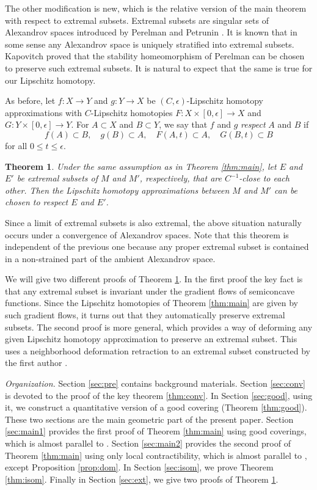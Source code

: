 \documentclass[a4paper,12pt]{amsart}
\theoremstyle{plain}
\newtheorem{thm}{Theorem}
\theoremstyle{definition}
\numberwithin{thm}{section}
\numberwithin{equation}{section}
\newcommand{\step}[1]{\medskip\noindent\textit{#1.}}
\begin{document}
The other modification is new, which is the relative version of the main theorem with respect to extremal subsets.
Extremal subsets are singular sets of Alexandrov spaces introduced by Perelman and Petrunin \cite{PP:ext}.
It is known that in some sense any Alexandrov space is uniquely stratified into extremal subsets.
Kapovitch \cite[\S9]{K:stab} proved that the stability homeomorphism of Perelman can be chosen to preserve such extremal subsets.
It is natural to expect that the same is true for our Lipschitz homotopy.

As before, let $f:X\to Y$ and $g:Y\to X$ be $(C,\epsilon)$-Lipschitz homotopy approximations with $C$-Lipschitz homotopies $F:X\times[0,\epsilon]\to X$ and $G:Y\times[0,\epsilon]\to Y$.
For $A\subset X$ and $B\subset Y$, we say that $f$ and $g$ \textit{respect} $A$ and $B$ if
\[f(A)\subset B,\quad g(B)\subset A,\quad F(A,t)\subset A,\quad G(B,t)\subset B\]
for all $0\le t\le\epsilon$.

\begin{thm} \label{thm:ext}
Under the same assumption as in Theorem \ref{thm:main}, let $E$ and $E'$ be extremal subsets of $M$ and $M'$, respectively, that are $C^{-1}$-close to each other.
Then the Lipschitz homotopy approximations between $M$ and $M'$ can be chosen to respect $E$ and $E'$.
\end{thm}

Since a limit of extremal subsets is also extremal, the above situation naturally occurs under a convergence of Alexandrov spaces.
Note that this theorem is independent of the previous one because any proper extremal subset is contained in a non-strained part of the ambient Alexandrov space.

We will give two different proofs of Theorem \ref{thm:ext}.
In the first proof the key fact is that any extremal subset is invariant under the gradient flows of semiconcave functions.
Since the Lipschitz homotopies of Theorem \ref{thm:main} are given by such gradient flows, it turns out that they automatically preserve extremal subsets.
The second proof is more general, which provides a way of deforming any given Lipschitz homotopy approximation to preserve an extremal subset.
This uses a neighborhood deformation retraction to an extremal subset constructed by the first author \cite[1.5]{F:reg}.

\step{Organization}
Section \ref{sec:pre} contains background materials.
Section \ref{sec:conv} is devoted to the proof of the key theorem \ref{thm:conv}.
In Section \ref{sec:good}, using it, we construct a quantitative version of a good covering (Theorem \ref{thm:good}).
These two sections are the main geometric part of the present paper.
Section \ref{sec:main1} provides the first proof of Theorem \ref{thm:main} using good coverings, which is almost parallel to \cite[\S3]{MY:lip}.
Section \ref{sec:main2} provides the second proof of Theorem \ref{thm:main} using only local contractibility, which is almost parallel to \cite[\S2--\S4]{Peter}, except Proposition \ref{prop:dom}.
In Section \ref{sec:isom}, we prove Theorem \ref{thm:isom}.
Finally in Section \ref{sec:ext}, we give two proofs of Theorem \ref{thm:ext}.
\end{document}
